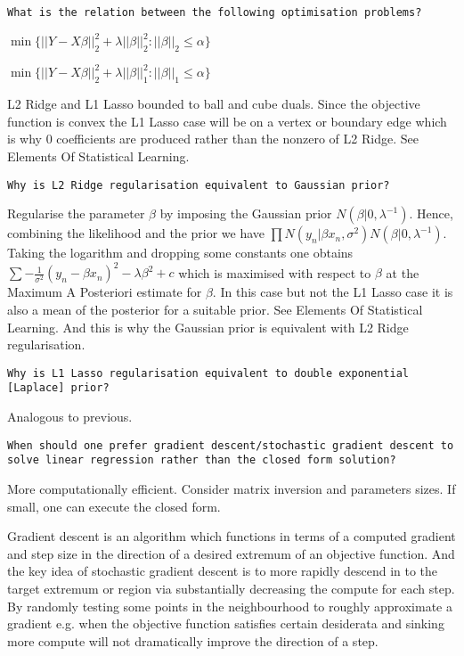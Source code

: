 \texttt{What is the relation between the following optimisation problems?}

$\min \{ ||Y - X \beta||_2^2 + \lambda ||\beta||_2^2 : ||\beta||_2 \le \alpha \}$

$\min \{ ||Y - X \beta||_2^2 + \lambda ||\beta||_1^2 : ||\beta||_1 \le \alpha \}$

L2 Ridge and L1 Lasso bounded to ball and cube duals. Since the objective function is convex the L1 Lasso case will be on a vertex or boundary edge which is why $0$ coefficients are produced rather than the nonzero of L2 Ridge. See Elements Of Statistical Learning.

\texttt{Why is L2 Ridge regularisation equivalent to Gaussian prior?}

Regularise the parameter $\beta$ by imposing the Gaussian prior $N(\beta | 0,\lambda^{-1})$. Hence, combining the likelihood and the prior we have $\prod N(y_n | \beta x_n,\sigma^2)N(\beta | 0,\lambda^{-1})$. Taking the logarithm and dropping some constants one obtains $\sum -\frac{1}{\sigma^2} (y_n - \beta x_n)^2 - \lambda \beta^2 + c$ which is maximised with respect to $\beta$ at the Maximum A Posteriori estimate for $\beta$. In this case but not the L1 Lasso case it is also a mean of the posterior for a suitable prior. See Elements Of Statistical Learning. And this is why the Gaussian prior is equivalent with L2 Ridge regularisation.

\texttt{Why is L1 Lasso regularisation equivalent to double exponential [Laplace] prior?}

Analogous to previous.

\texttt{When should one prefer gradient descent/stochastic gradient descent to solve linear regression rather than the closed form solution?}

More computationally efficient. Consider matrix inversion and parameters sizes. If small, one can execute the closed form.

Gradient descent is an algorithm which functions in terms of a computed gradient and step size in the direction of a desired extremum of an objective function. And the key idea of stochastic gradient descent is to more rapidly descend in to the target extremum or region via substantially decreasing the compute for each step. By randomly testing some points in the neighbourhood to roughly approximate a gradient e.g. when the objective function satisfies certain desiderata and sinking more compute will not dramatically improve the direction of a step.

